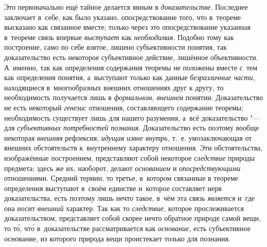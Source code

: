 Это первоначально ещё тайное делается явным в
{\em доказательстве}.
Последнее заключает в~себе, как было указано,
опосредствование того, что в~теореме высказано как связанное вместе; только
через это опосредствование указанная в~теореме связь впервые
{\em выступает} как
{\em необходимая}.
Подобно тому как построение, само по себе взятое, лишено
субъективности понятия, так доказательство есть некоторое субъективное
действие, лишённое объективности. А~именно, так как определения содержания
теоремы не положены вместе с~тем как определения понятия, а~выступают
только как данные {\em безразличные
части,} находящиеся в~многообразных внешних отношениях друг
к другу, то необходимость получается лишь в
{\em формальном, внешнем}
понятии. Доказательство не есть некоторый
{\em генезис} отношения,
составляющего содержание теоремы; необходимость существует лишь для нашего
разумения, а~всё доказательство "--- для
{\em субъективных потребностей
познания}. Доказательство есть поэтому вообще некоторая
{\em внешняя} рефлексия,
{\em идущая извне внутрь,}
т.~е. умозаключающая от внешних обстоятельств к~внутреннему
характеру отношения. Эти обстоятельства, изображённые построением,
представляют собой некоторое
{\em следствие} природы
предмета; здесь же их, наоборот, делают
{\em основанием} и
{\em опосредствующими}
отношениями. Средний термин, то третье, в~котором связанные в
теореме определения выступают в~своём единстве и~которое составляет нерв
доказательства, есть поэтому лишь нечто такое, в~чём эта связь
{\em является} и~где она
носит {\em внешний}
характер. Так как то
{\em следствие,} которое
прослеживается доказательством, представляет собой скорее нечто обратное
природе самой вещи, то т\'{о}, чт\'{о} в~доказательстве рассматривается как
{\em основание,} есть
субъективное основание, из которого природа вещи проистекает только для
познания.

